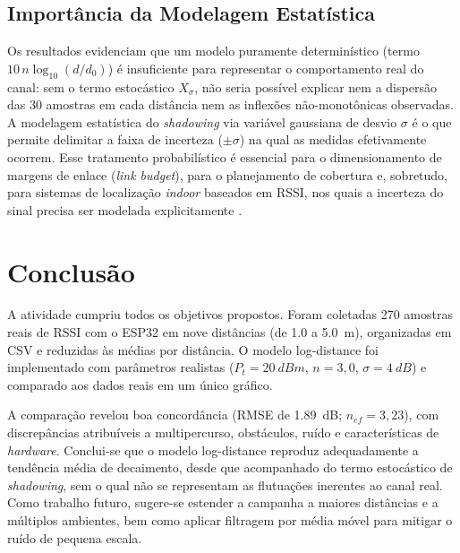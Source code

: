 \documentclass[
  12pt,
  a4paper,
  oneside,
  brazil,
  chapter=TITLE,
  section=TITLE,
]{abntex2}
\begin{document}
\section{Import\^ancia da Modelagem Estat\'istica}

Os resultados evidenciam que um modelo puramente determin\'istico
(termo $10\,n\log_{10}(d/d_0)$) \'e insuficiente para representar o
comportamento real do canal: sem o termo estoc\'astico $X_\sigma$, n\~ao seria
poss\'ivel explicar nem a dispers\~ao das 30 amostras em cada dist\^ancia nem as
inflex\~oes n\~ao-monot\^onicas observadas. A modelagem estat\'istica do
\textit{shadowing} via vari\'avel gaussiana de desvio $\sigma$ \'e o que permite
delimitar a faixa de incerteza ($\pm\sigma$) na qual as medidas efetivamente
ocorrem. Esse tratamento probabil\'istico \'e essencial para o
dimensionamento de margens de enlace (\textit{link budget}), para o
planejamento de cobertura e, sobretudo, para sistemas de localiza\c{c}\~ao
\textit{indoor} baseados em RSSI, nos quais a incerteza do sinal precisa ser
modelada explicitamente \cite{bahl2000radar,goldsmith2005}.

\chapter{Conclus\~ao}

A atividade cumpriu todos os objetivos propostos. Foram coletadas 270 amostras
reais de RSSI com o ESP32 em nove dist\^ancias (de \SI{1.0}{} a \SI{5.0}{\meter}),
organizadas em CSV e reduzidas \`as m\'edias por dist\^ancia. O modelo
log-distance foi implementado com par\^ametros realistas ($P_t = \SI{20}{dBm}$,
$n = 3{,}0$, $\sigma = \SI{4}{dB}$) e comparado aos dados reais em um \'unico
gr\'afico.

A compara\c{c}\~ao revelou boa concord\^ancia (RMSE de \SI{1.89}{dB};
$n_{ef} = 3{,}23$), com discrep\^ancias atribu\'iveis a multipercurso,
obst\'aculos, ru\'ido e caracter\'isticas de \textit{hardware}. Conclui-se que o
modelo log-distance reproduz adequadamente a tend\^encia m\'edia de decaimento,
desde que acompanhado do termo estoc\'astico de \textit{shadowing}, sem o qual
n\~ao se representam as flutua\c{c}\~oes inerentes ao canal real. Como trabalho
futuro, sugere-se estender a campanha a maiores dist\^ancias e a m\'ultiplos
ambientes, bem como aplicar filtragem por m\'edia m\'ovel para mitigar o ru\'ido
de pequena escala.

\postextual


\end{document}
